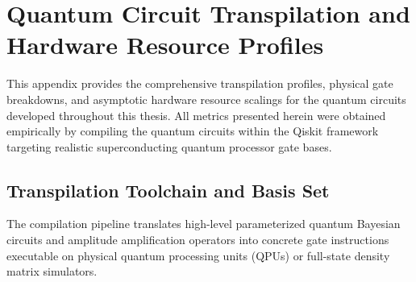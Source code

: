 \chapter{Quantum Circuit Transpilation and Hardware Resource Profiles}\label{app:transpilation_profiles}

This appendix provides the comprehensive transpilation profiles, physical gate breakdowns, and asymptotic hardware resource scalings for the quantum circuits developed throughout this thesis. All metrics presented herein were obtained empirically by compiling the quantum circuits within the Qiskit framework targeting realistic superconducting quantum processor gate bases.

\section{Transpilation Toolchain and Basis Set}\label{sec:app_transpiler_env}

The compilation pipeline translates high-level parameterized quantum Bayesian circuits and amplitude amplification operators into concrete gate instructions executable on physical quantum processing units (QPUs) or full-state density matrix simulators. 

